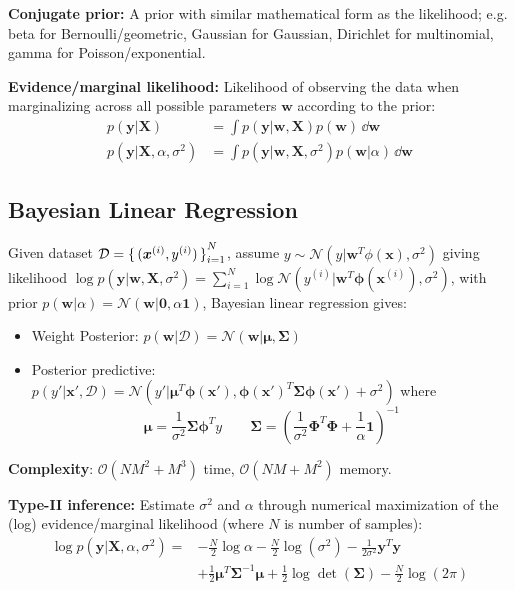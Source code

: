 \documentclass[twocolumn, 8pt]{extarticle}
\begin{document}
\textbf{Conjugate prior:} A prior with similar mathematical form as the likelihood; e.g. beta for Bernoulli/geometric,
Gaussian for Gaussian, Dirichlet for multinomial, gamma for Poisson/exponential.

\textbf{Evidence/marginal likelihood:} Likelihood of observing the data when marginalizing across all possible
parameters \(\bm w\) according to the prior:
\begin{align*}
    p(\bm y | \bm X) &= \int p(\bm y | \bm w, \bm X)p(\bm w)\,\dd\bm w \\
    p(\bm y | \bm X, \alpha, \sigma^2) &= \int p(\bm y | \bm w, \bm X, \sigma^2)p(\bm w | \alpha)\,\dd\bm w
\end{align*}

\subsection{Bayesian Linear Regression}

Given dataset \(\mathcal D = \set{(\bm x^{(i)}, y^{(i)})}_{i = 1}^N\), assume \(y \sim \mathcal N(y | \bm w^T\phi(\bm x), \sigma^2)\)
giving likelihood \(\log p(\bm y | \bm w, \bm X, \sigma^2) = \sum _{i = 1}^N \log\mathcal N(y^{(i)} | \bm w^T\bm\phi(\bm x^{(i)}), \sigma^2)\),
with prior \(p(\bm w | \alpha) = \mathcal N(\bm w | \bm 0, \alpha\bm 1)\), Bayesian linear regression gives:
\begin{itemize}
    \item Weight Posterior: \(p(\bm w | \mathcal D) = \mathcal N(\bm w | \bm \mu, \bm\Sigma)\)
    \item Posterior predictive: \(p(y' | \bm x', \mathcal D) = \mathcal N(y' | \bm\mu^T\bm\phi(\bm x'), \bm\phi(\bm x')^T\bm\Sigma\bm\phi(\bm x') + \sigma^2)\)
          where \[\bm\mu = \frac{1}{\sigma^2}\bm\Sigma\bm\phi^T y \qquad \bm\Sigma = \left(\frac{1}{\sigma^2}\bm\Phi^T\bm\Phi + \frac{1}{\alpha}\bm 1\right)^{-1}\]
\end{itemize}

\textbf{Complexity}: \(\mathcal O(NM^2 + M^3)\) time, \(\mathcal O(NM + M^2)\) memory.

\textbf{Type-II inference:} Estimate \(\sigma^2\) and \(\alpha\) through numerical maximization of the (log) 
evidence/marginal likelihood (where \(N\) is number of samples):
\begin{align*}
    \log p(\bm y | \bm X, \alpha, \sigma^2)
    = &-\frac{N}{2}\log\alpha - \frac{N}{2}\log(\sigma^2) - \frac{1}{2\sigma^2}\bm y^T\bm y \\
    &+ \frac{1}{2}\bm\mu^T\bm\Sigma^{-1}\bm\mu + \frac{1}{2}\log\det(\bm\Sigma) - \frac{N}{2}\log(2\pi)
\end{align*}
\end{document}
